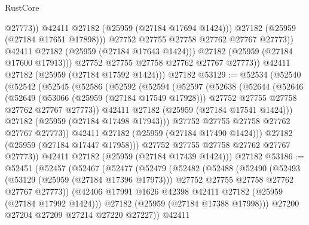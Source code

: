 \begin{lexlean}{RustCore}
\begin{coremodule}
                          @27773))
                      @42411
                      @27182
                      (@25959 (@27184 @17694 @1424)))
                    @27182
                    (@25959 (@27184 @17651 @17898)))
                  @27752
                  @27755
                  @27758
                  @27762
                  @27767
                  @27773))
              @42411
              @27182
              (@25959 (@27184 @17643 @1424)))
            @27182
            (@25959 (@27184 @17600 @17913)))
          @27752
          @27755
          @27758
          @27762
          @27767
          @27773))
      @42411
      @27182
      (@25959 (@27184 @17592 @1424)))
    @27182
@53129 := @52534
    (@52540
      (@52542
        (@52545
          (@52586
            (@52592
              (@52594
                (@52597
                  (@52638
                    (@52644
                      (@52646
                        (@52649
                          (@53066 (@25959 (@27184 @17549 @17928)))
                          @27752
                          @27755
                          @27758
                          @27762
                          @27767
                          @27773))
                      @42411
                      @27182
                      (@25959 (@27184 @17541 @1424)))
                    @27182
                    (@25959 (@27184 @17498 @17943)))
                  @27752
                  @27755
                  @27758
                  @27762
                  @27767
                  @27773))
              @42411
              @27182
              (@25959 (@27184 @17490 @1424)))
            @27182
            (@25959 (@27184 @17447 @17958)))
          @27752
          @27755
          @27758
          @27762
          @27767
          @27773))
      @42411
      @27182
      (@25959 (@27184 @17439 @1424)))
    @27182
@53186 := @52451
    (@52457
      (@52467
        (@52477
          (@52479
            (@52482
              (@52488
                (@52490
                  (@52493
                    (@53129 (@25959 (@27184 @17396 @17973)))
                    @27752
                    @27755
                    @27758
                    @27762
                    @27767
                    @27773))
                (@42406 @17991 @1626 @42398 @42411 @27182 (@25959 (@27184 @17992 @1424)))
                @27182
                (@25959 (@27184 @17388 @17998)))
              @27200
              @27204
              @27209
              @27214
              @27220
              @27227))
          @42411

\end{coremodule}
\end{lexlean}
